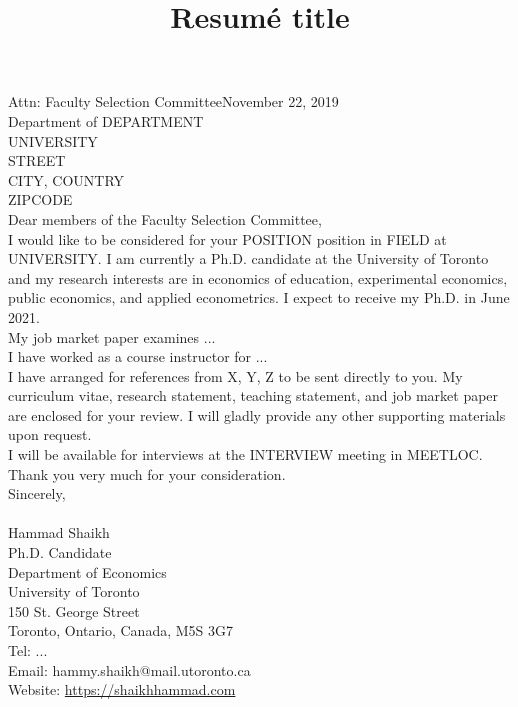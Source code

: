 \documentclass[11pt,a4paper]{moderncv}        %
\title{Resumé title}                               %
\begin{document}
Attn: Faculty Selection Committee\hfill November 22, 2019\\
Department of DEPARTMENT \\ %
UNIVERSITY \\ %
STREET  \\ %
CITY, COUNTRY \\    %
ZIPCODE \\       %



Dear members of the Faculty Selection Committee,\\

I would like to be considered for your POSITION position in 
FIELD
 at UNIVERSITY.
  I am currently a Ph.D. candidate at the University of Toronto and my research interests are in economics of education, experimental economics, public economics, and applied econometrics.  I expect to receive my Ph.D. in June 2021.\\

My job market paper examines ... \\

I have worked as a course instructor for ... \\

I have arranged for references from X, Y, Z to be sent directly to you. My curriculum vitae, research statement, teaching statement, and job market paper are enclosed for your review. I will gladly provide any other supporting materials upon request.\\

I will be available for interviews at the INTERVIEW meeting in MEETLOC. Thank you very much for your consideration.\\

Sincerely,\\\\
\noindent Hammad Shaikh\\
Ph.D. Candidate\\
Department of Economics\\
University of Toronto\\
150 St. George Street\\
Toronto, Ontario, Canada, M5S 3G7\\
Tel: ... \\
Email: hammy.shaikh@mail.utoronto.ca\\
Website: \url{https://shaikhhammad.com}
\end{document}
